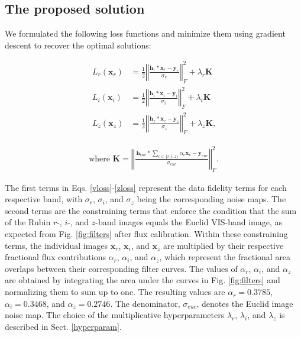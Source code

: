 \documentclass[traditabstract]{aa}
\begin{document}
\subsection{The proposed solution}
\label{forward_model}

We formulated the following loss functions and minimize them using gradient descent to recover the optimal solutions:

\begin{align} 
    L_r(\mathbf{x}_r) &= \frac{1}{2} \left\Vert \frac{\mathbf{h}_r \ast \mathbf{x}_r - \mathbf{y}_r}{\sigma_r} \right\Vert_F^2  + \lambda_{r} \textbf{K} \label{vloss}\\[10pt]
    L_i(\mathbf{x}_i) &= \frac{1}{2} \left\Vert \frac{\mathbf{h}_i \ast \mathbf{x}_i - \mathbf{y}_i}{\sigma_i} \right\Vert_F^2  + \lambda_{i} \textbf{K} \label{iloss}\\[10pt]
    L_z(\mathbf{x}_z) &= \frac{1}{2} \left\Vert \frac{\mathbf{h}_z \ast \mathbf{x}_z - \mathbf{y}_z}{\sigma_z} \right\Vert_F^2  + \lambda_{z} \textbf{K,} \label{zloss}
\end{align}

\begin{align}
\text{where } \textbf{K} = \left\Vert \frac{\hspace{2pt} \mathbf{h}_{euc} \ast \sum\limits_{c\in\{r,i,z\}} \alpha_c \mathbf{x}_c - \mathbf{y}_{euc} }{\sigma_{euc}} \right\Vert_F^2 \label{eq:constr}.
\end{align}

\noindent The first terms in Eqs. \ref{vloss}-\ref{zloss} represent the data fidelity terms for each respective band, with $\sigma_r$, $\sigma_i$, and $\sigma_z$ being the corresponding noise maps. The second terms are the constraining terms that enforce the condition that the sum of the Rubin $r$-, $i$-, and $z$-band images equals the Euclid VIS-band image, as expected from Fig. \ref{fig:filters} after flux calibration. Within these constraining terms, the individual images $\mathbf{x}_r$, $\mathbf{x}_i$, and $\mathbf{x}_z$ are multiplied by their respective fractional flux contributions $\alpha_r$, $\alpha_i$, and $\alpha_z$, which represent the fractional area overlaps between their corresponding filter curves. The values of $\alpha_r$, $\alpha_i$, and $\alpha_z$ are obtained by integrating the area under the curves in Fig. \ref{fig:filters} and normalizing them to sum up to one. The resulting values are $\alpha_r=0.3785$, $\alpha_i=0.3468$, and $\alpha_z=0.2746$. The denominator, $\sigma_{euc}$, denotes the Euclid image noise map. The choice of the multiplicative hyperparameters $\lambda_{r}$, $\lambda_{i}$, and $\lambda_{z}$ is described in Sect. \ref{hyperparam}.
\end{document}
